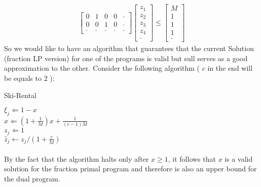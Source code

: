 \documentclass{article}
\begin{document}
\begin{multicols*}{2}
\begin{equation*}
\begin{split}
\begin{bmatrix}
	0 & 1 & 0 & 0 & \cdot \\
	0 & 0 & 1 & 0 & \cdot \\
	\cdot & \cdot & \cdot & \cdot & \cdot
      \end{bmatrix} 
      \begin{bmatrix}
	z_{1} \\
	z_{2} \\ 
	z_{3} \\
	z_{4} \\
	\cdot 
      \end{bmatrix} \le
      \begin{bmatrix}
	M \\
	1 \\ 
	1 \\
	1 \\
	\cdot 
      \end{bmatrix}
    \end{split}
  \end{equation*}
  So we would like to have an algorithm that guarantees that the current Solution (fraction LP version) for one of the programs is valid but sull serves as a good approximation to the other. Consider the following algorithm ( $c$ in the end will be equals to $2$ ): 

  \begin{algorithm}[H]
    \caption{Ski-Rental}
    \label{alg:three}
     {
       { 
	$ \xi_{j} \Leftarrow 1 - x$ \\
	$ x \Leftarrow \left( 1 + \frac{1}{M} \right) x + \frac{1}{\left( c - 1 \right) M } $ \\
	$ z_{j} \Leftarrow 1$ \\ 
	$\tilde{z_{j}} \leftarrow z_{j} / \left(  1 + \frac{c}{M} \right)  $ 
      }
  }
  \end{algorithm}
  
  \paragraph{}

By the fact that the algorithm halts only after $x \ge 1 $, it follows that $x$ is a valid solution for the fraction primal program and therefore is also an upper bound for the dual program. 


\end{multicols*}
\end{document}
